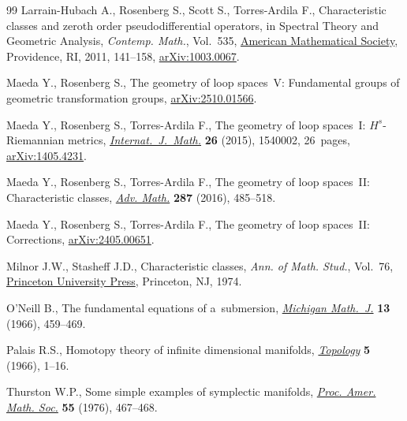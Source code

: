 \begin{thebibliography}{99}
Larrain-Hubach A., Rosenberg S., Scott S., Torres-Ardila F., Characteristic
 classes and zeroth order pseudodifferential operators, in Spectral Theory and
 Geometric Analysis, \textit{Contemp. Math.}, Vol.~535,
 \href{https://doi.org/10.1090/conm/535/10539}{American Mathematical Society},
 Providence, RI, 2011, 141--158,
 \href{http://arxiv.org/abs/1003.0067}{arXiv:1003.0067}.

Maeda Y., Rosenberg S., The geometry of loop spaces~{V}: {F}undamental groups
 of geometric transformation groups,
 \href{http://arxiv.org/abs/2510.01566}{arXiv:2510.01566}.

Maeda Y., Rosenberg S., Torres-Ardila F., The geometry of loop spaces~{I}:
 {$H^s$}-{R}iemannian metrics,
 \href{https://doi.org/10.1142/S0129167X15400029}{\textit{Internat.~J.~Math.}}
 \textbf{26} (2015), 1540002, 26~pages,
 \href{http://arxiv.org/abs/1405.4231}{arXiv:1405.4231}.

Maeda Y., Rosenberg S., Torres-Ardila F., The geometry of loop spaces~{II}:
 {C}haracteristic classes,
 \href{https://doi.org/10.1016/j.aim.2015.10.001}{\textit{Adv. Math.}}
 \textbf{287} (2016), 485--518.

Maeda Y., Rosenberg S., Torres-Ardila F., The geometry of loop spaces~{II}: {C}orrections,
 \href{http://arxiv.org/abs/2405.00651}{arXiv:2405.00651}.


Milnor J.W., Stasheff J.D., Characteristic classes, \textit{Ann. of Math.
 Stud.}, Vol.~76, \href{https://doi.org/10.1515/9781400881826}{Princeton
 University Press}, Princeton, NJ, 1974.

O'Neill B., The fundamental equations of a~submersion,
 \href{https://doi.org/10.1307/mmj/1028999604}{\textit{Michigan Math.~J.}}
 \textbf{13} (1966), 459--469.

Palais R.S., Homotopy theory of infinite dimensional manifolds,
 \href{https://doi.org/10.1016/0040-9383(66)90002-4}{\textit{Topology}}
 \textbf{5} (1966), 1--16.

Thurston W.P., Some simple examples of symplectic manifolds,
 \href{https://doi.org/10.2307/2041749}{\textit{Proc. Amer. Math. Soc.}}
 \textbf{55} (1976), 467--468.

\end{thebibliography}

